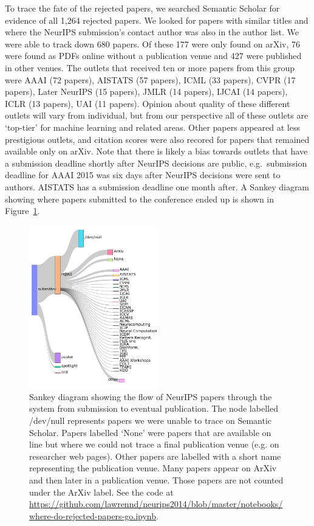 \documentclass[twoside]{article}
\begin{document}
To trace the fate of the rejected papers, we searched Semantic Scholar
for evidence of all 1,264 rejected papers. We looked for papers with
similar titles and where the NeurIPS submission's contact author was
also in the author list. We were able to track down 680 papers. Of
these 177 were only found on arXiv, 76 were found as PDFs online
without a publication venue and 427 were published in other
venues. The outlets that received ten or more papers from this group
were AAAI (72 papers), AISTATS (57 papers), ICML (33 papers), CVPR (17
papers), Later NeurIPS (15 papers), JMLR (14 papers), IJCAI (14
papers), ICLR (13 papers), UAI (11 papers).  Opinion about quality of
these different outlets will vary from individual, but from our
perspective all of these outlets are `top-tier' for machine learning
and related areas. Other papers appeared at less prestigious outlets, and citation scores were also recored for papers that remained available only on arXiv.  Note that there is likely a bias towards outlets
that have a submission deadline shortly after NeurIPS decisions are
public, e.g.\ submission deadline for AAAI 2015 was six days after
NeurIPS decisions were sent to authors. AISTATS has a submission
deadline one month after. A Sankey diagram showing where papers
submitted to the conference ended up is shown in Figure~\ref{figure-where-do-neurips-papers-go}.

\begin{figure}[htb]
\centering
\includegraphics[width=0.5\textwidth]{diagrams/neurips/where-do-neurips-papers-go.pdf}

\caption{Sankey diagram showing the flow of NeurIPS papers through the system from submission to eventual publication. The node labelled /dev/null represents papers we were unable to trace on Semantic Scholar. Papers labelled `None' were papers that are available on line but where we could not trace a final publication venue (e.g. on researcher web pages). Other papers are labelled with a short name representing the publication venue. Many papers appear on ArXiv and then later in a publication venue. Those papers are not counted under the ArXiv label.  See the code at \url{https://github.com/lawrennd/neurips2014/blob/master/notebooks/where-do-rejected-papers-go.ipynb}.}
\label{figure-where-do-neurips-papers-go}
\end{figure}
\end{document}
